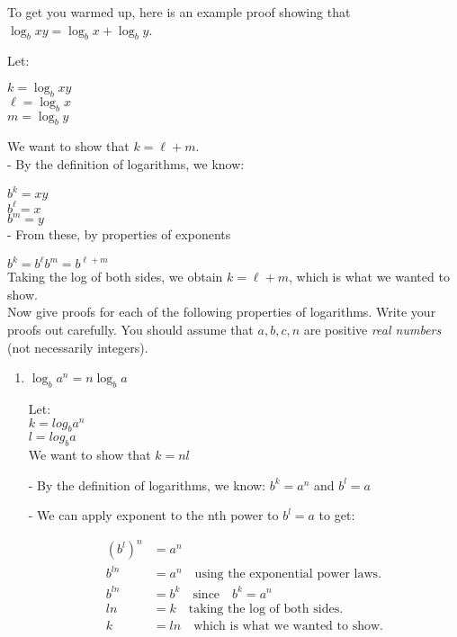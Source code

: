 \documentclass[11pt]{article}
\begin{document}
\begin{enumerate}
To get you warmed up, here is an example proof showing that $\log_{b} xy = \log_{b} x + \log_{b} y$.

Let:

$k = \log_{b} xy$\\
$\ell = \log_{b} x$\\
$m = \log_{b} y$

We want to show that $k=\ell+m$.\\

- By the definition of logarithms, we know:

$b^{k} = xy$\\
$b^{\ell} = x$\\
$b^{m} = y$\\

- From these, by properties of exponents

$b^{k} = b^{\ell} b^{m} = b^{\ell + m}$\\

Taking the log of both sides, we obtain $k = \ell + m$, which is what we wanted to show.\\

Now give proofs for each of the following properties of logarithms.
Write your proofs out carefully.  You should assume that $a, b, c, n$
are positive \emph{real numbers} (not necessarily integers).

\begin{enumerate}
\item $\log_{b} a^{n} = n \log_{b} a$

    Let:\\
    $k=log_b a^n$\\
    $l=log_b a$\\
    We want to show that $k=nl$

    - By the definition of logarithms, we know:
    $b^k=a^n$ and $b^l=a$

    - We can apply exponent to the nth power to $b^l=a$ to get:

\begin{align*}
    (b^l)^n &= a^n \\ 
    b^{ln} &= a^n  \quad \text{using the exponential power laws.} \\ 
    b^{ln} &= b^k \quad \text{since} \quad b^k=a^n \\
    ln &= k \quad \text{taking the log of both sides.} \\
    k &= ln \quad \text{which is what we wanted to show.} \\
\end{align*}


\end{enumerate}
\end{enumerate}
\end{document}
